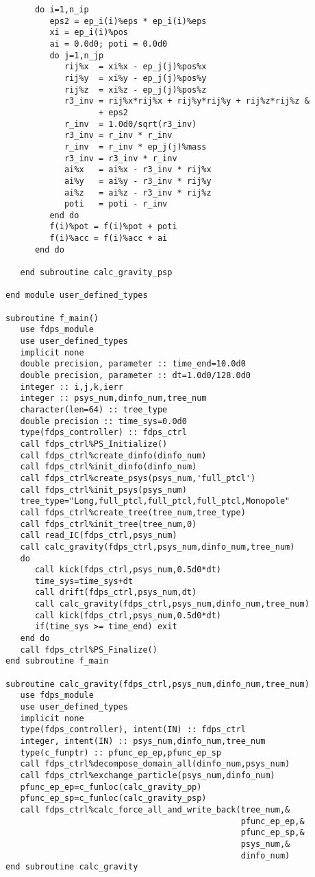 \documentclass[10pt,twocolumn,a4paper,fleqn]{article}
\begin{document}
\begin{mdframed}[
    backgroundcolor=bg,
    topline=false,
    bottomline=false,
    leftline=false,
    rightline=false]
\begin{verbatim}
      do i=1,n_ip
         eps2 = ep_i(i)%eps * ep_i(i)%eps
         xi = ep_i(i)%pos
         ai = 0.0d0; poti = 0.0d0
         do j=1,n_jp
            rij%x  = xi%x - ep_j(j)%pos%x
            rij%y  = xi%y - ep_j(j)%pos%y
            rij%z  = xi%z - ep_j(j)%pos%z
            r3_inv = rij%x*rij%x + rij%y*rij%y + rij%z*rij%z &
                   + eps2
            r_inv  = 1.0d0/sqrt(r3_inv)
            r3_inv = r_inv * r_inv
            r_inv  = r_inv * ep_j(j)%mass
            r3_inv = r3_inv * r_inv
            ai%x   = ai%x - r3_inv * rij%x
            ai%y   = ai%y - r3_inv * rij%y
            ai%z   = ai%z - r3_inv * rij%z
            poti   = poti - r_inv
         end do
         f(i)%pot = f(i)%pot + poti
         f(i)%acc = f(i)%acc + ai
      end do

   end subroutine calc_gravity_psp

end module user_defined_types

subroutine f_main()
   use fdps_module
   use user_defined_types
   implicit none
   double precision, parameter :: time_end=10.0d0
   double precision, parameter :: dt=1.0d0/128.0d0
   integer :: i,j,k,ierr
   integer :: psys_num,dinfo_num,tree_num
   character(len=64) :: tree_type
   double precision :: time_sys=0.0d0
   type(fdps_controller) :: fdps_ctrl
   call fdps_ctrl%PS_Initialize()
   call fdps_ctrl%create_dinfo(dinfo_num)
   call fdps_ctrl%init_dinfo(dinfo_num)
   call fdps_ctrl%create_psys(psys_num,'full_ptcl')
   call fdps_ctrl%init_psys(psys_num)
   tree_type="Long,full_ptcl,full_ptcl,full_ptcl,Monopole"
   call fdps_ctrl%create_tree(tree_num,tree_type)
   call fdps_ctrl%init_tree(tree_num,0)
   call read_IC(fdps_ctrl,psys_num)
   call calc_gravity(fdps_ctrl,psys_num,dinfo_num,tree_num)
   do
      call kick(fdps_ctrl,psys_num,0.5d0*dt)
      time_sys=time_sys+dt
      call drift(fdps_ctrl,psys_num,dt)
      call calc_gravity(fdps_ctrl,psys_num,dinfo_num,tree_num)
      call kick(fdps_ctrl,psys_num,0.5d0*dt)
      if(time_sys >= time_end) exit
   end do
   call fdps_ctrl%PS_Finalize()
end subroutine f_main

subroutine calc_gravity(fdps_ctrl,psys_num,dinfo_num,tree_num)
   use fdps_module
   use user_defined_types
   implicit none
   type(fdps_controller), intent(IN) :: fdps_ctrl
   integer, intent(IN) :: psys_num,dinfo_num,tree_num
   type(c_funptr) :: pfunc_ep_ep,pfunc_ep_sp
   call fdps_ctrl%decompose_domain_all(dinfo_num,psys_num)
   call fdps_ctrl%exchange_particle(psys_num,dinfo_num)
   pfunc_ep_ep=c_funloc(calc_gravity_pp)
   pfunc_ep_sp=c_funloc(calc_gravity_psp)
   call fdps_ctrl%calc_force_all_and_write_back(tree_num,&
                                                pfunc_ep_ep,&
                                                pfunc_ep_sp,&
                                                psys_num,&
                                                dinfo_num)
end subroutine calc_gravity


\end{verbatim}
\end{mdframed}
\end{document}
